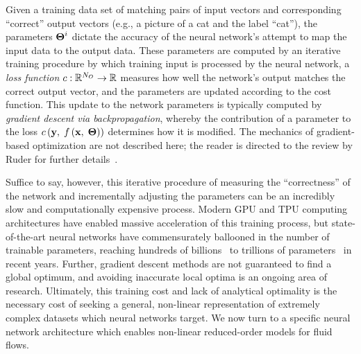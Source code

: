 Given a training data set of matching pairs of input vectors and corresponding ``correct'' output vectors (e.g., a picture of a cat and the label ``cat''), the parameters $\boldsymbol{\Theta}^{i}$ dictate the accuracy of the neural network's attempt to map the input data to the output data. These parameters are computed by an iterative training procedure by which training input is processed by the neural network, a \textit{loss function} $c: \mathbb{R}^{N_{O}} \rightarrow \mathbb{R}$ measures how well the network's output matches the correct output vector, and the parameters are updated according to the cost function. This update to the network parameters is typically computed by \textit{gradient descent via backpropagation}, whereby the contribution of a parameter to the loss $c\left(\mathbf{y}, \; f\left({\mathbf{x}, \; \boldsymbol{\Theta}}\right)\right)$ determines how it is modified. The mechanics of gradient-based optimization are not described here; the reader is directed to the review by Ruder for further details~\cite{Ruder2016}.

Suffice to say, however, this iterative procedure of measuring the ``correctness'' of the network and incrementally adjusting the parameters can be an incredibly slow and computationally expensive process. Modern GPU and TPU computing architectures have enabled massive acceleration of this training process, but state-of-the-art neural networks have commensurately ballooned in the number of trainable parameters, reaching hundreds of billions~\cite{Brown2020} to trillions of parameters~\cite{Fedus2022} in recent years. Further, gradient descent methods are not guaranteed to find a global optimum, and avoiding inaccurate local optima is an ongoing area of research. Ultimately, this training cost and lack of analytical optimality is the necessary cost of seeking a general, non-linear representation of extremely complex datasets which neural networks target. We now turn to a specific neural network architecture which enables non-linear reduced-order models for fluid flows.

